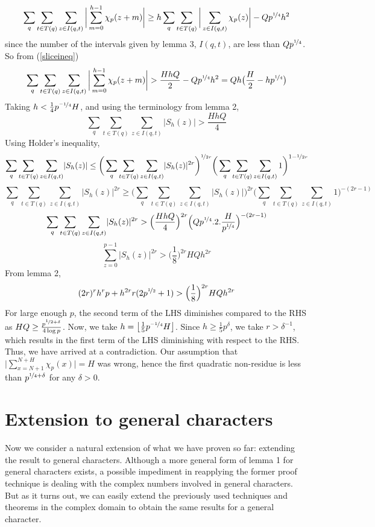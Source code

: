 \documentclass{report}
\begin{document}
$$\sum_q\sum\limits_{t\in T(q)}\sum\limits_{z\in I(q,t)}\bigg \lvert \sum\limits_{m=0}^{h-1}\chi_p(z+m) \bigg \rvert \geq h\sum_q\sum\limits_{t\in T(q)}\bigg \lvert \sum\limits_{z\in I(q,t)}\chi_p(z)\bigg \rvert-Qp^{\nicefrac{1}{4}}h^2$$
since the number of the intervals given by lemma 3, $I(q,t)$, are less than $Qp^{\nicefrac{1}{4}}$. So from (\ref{sliceineq})
$$\sum_q\sum\limits_{t\in T(q)}\sum\limits_{z\in I(q,t)}\bigg \lvert \sum\limits_{m=0}^{h-1}\chi_p(z+m) \bigg \rvert > \frac{HhQ}{2}-Qp^{\nicefrac{1}{4}} h^2=Qh\big(\frac{H}{2}-hp^{\nicefrac{1}{4}}\big)$$
Taking $h<\frac{1}{4}p^{\nicefrac{-1}{4}}H$, and using the terminology from lemma 2,
$$\sum_q\sum\limits_{t\in T(q)}\sum\limits_{z\in I(q,t)}\lvert S_h(z) \rvert > \frac{HhQ}{4}$$
Using Holder's inequality,
$$\sum_q\sum\limits_{t\in T(q)}\sum\limits_{z\in I(q,t)}\lvert S_h(z) \rvert \leq \bigg ( \sum_q\sum\limits_{t\in T(q)}\sum\limits_{z\in I(q,t)}\lvert S_h(z) \rvert^{2r} \bigg )^{\nicefrac{1}{2r}}\bigg ( \sum_q\sum\limits_{t\in T(q)}\sum\limits_{z\in I(q,t)}1 \bigg )^{1-\nicefrac{1}{2r}}$$
$$\sum_q\sum\limits_{t\in T(q)}\sum\limits_{z\in I(q,t)}\lvert S_h(z) \rvert^{2r} \geq \bigg ( \sum_q\sum\limits_{t\in T(q)}\sum\limits_{z\in I(q,t)}\lvert S_h(z) \rvert \bigg )^{2r} \bigg ( \sum_q\sum\limits_{t\in T(q)}\sum\limits_{z\in I(q,t)}1 \bigg )^{-(2r-1)}$$
$$\sum_q\sum\limits_{t\in T(q)}\sum\limits_{z\in I(q,t)}\lvert S_h(z) \rvert^{2r} > \Big( \frac{HhQ}{4}\Big)^{2r}\Big ( Qp^{\nicefrac{1}{4}}.2.\frac{H}{p^{\nicefrac{1}{4}}}\Big )^{-(2r-1)}$$
$$\sum\limits_{z=0}^{p-1}\lvert S_h(z) \rvert^{2r}>\Big(\frac{1}{8}\Big)^{2r}HQh^{2r}$$
From lemma 2,
$$(2r)^{r}h^{r}p+h^{2r}r(2p^{\nicefrac{1}{2}}+1)>\Big(\frac{1}{8}\Big)^{2r}HQh^{2r}$$
For large enough $p$, the second term of the LHS diminishes compared to the RHS as $HQ\geq \frac{p^{\nicefrac{1}{2}+\delta}}{4\log p}$. Now, we take $h=\left \lfloor \frac{1}{5}p^{\nicefrac{-1}{4}}H \right \rfloor$. Since $h \geq \frac{1}{5}p^{\delta}$, we take $r>\delta^{-1}$, which results in the first term of the LHS diminishing with respect to the RHS.
Thus, we have arrived at a contradiction. Our assumption that $\Big \lvert \sum\limits_{x=N+1}^{N+H}\chi_p(x)\Big \rvert=H$ was wrong, hence the first quadratic non-residue is less than $p^{\nicefrac{1}{4}+\delta}$ for any $\delta>0$.
%
%
\section{Extension to general characters}
%
%
Now we consider a natural extension of what we have proven so far: extending the result to general characters. Although a more general form of lemma 1 for general characters exists, a possible impediment in reapplying the former proof technique is dealing with the complex numbers involved in general characters. But as it turns out, we can easily extend the previously used techniques and theorems in the complex domain to obtain the same results for a general character.
\end{document}
